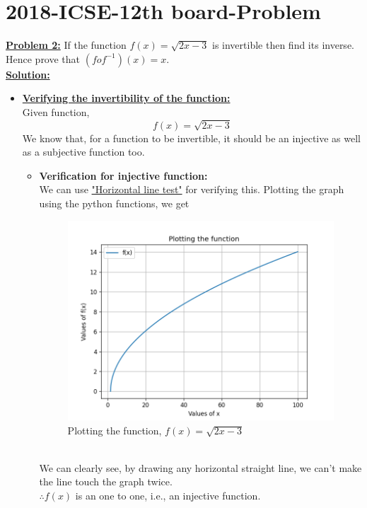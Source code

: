 \documentclass[journal,12pt,twocolumn]{IEEEtran}
\begin{document}
	\section{2018-ICSE-12th board-Problem}
\textbf{\underline{Problem 2:}} If the function $f(x)=\sqrt{2x-3}$ is invertible then find its inverse. Hence prove that $(fof^{-1})(x)=x$.\\
	\textbf{\underline{Solution:} }
	\begin{itemize}
	\item
	\textbf{\underline{Verifying the invertibility of the function:}}\\
	Given function,
	\begin{equation}\label{eqn}
	f(x) = \sqrt{2x-3}
	\end{equation}
	We know that, for a function to be invertible, it should be an injective as well as a subjective function too.
	\begin{itemize}
	\item
	\textbf{Verification for injective function:}\\
	We can use \underline{"Horizontal line test"} for verifying this. Plotting the graph using the python functions, we get
	\begin{figure}[h!]
		\centering
		\includegraphics[width=\columnwidth]{Fig_1.png}
		\caption{Plotting the function, $f(x) = \sqrt{2x-3}$}
	\end{figure}\\
	We can clearly see, by drawing any horizontal straight line, we can't make the line touch the graph twice.\\
	$\therefore f(x)$ is an one to one, i.e., an injective function.

\end{itemize}
\end{itemize}
\end{document}
